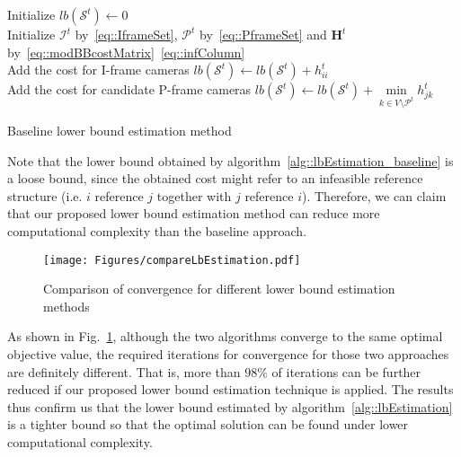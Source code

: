 \begin{algorithm}[]
 \SetAlgoLined
 \BlankLine
 Initialize $lb(\mathcal{S}^t) \gets 0$\\
 Initialize $\mathcal{I}^t$ by~\eqref{eq::IframeSet}, $\mathcal{P}^t$ by~\eqref{eq::PframeSet} and $\mathbf{H}^t$ by~\eqref{eq::modBBcostMatrix}~\eqref{eq::infColumn} \\
 {
 	Add the cost for I-frame cameras $lb(\mathcal{S}^t) \gets lb(\mathcal{S}^t) + h_{ii}^t$ \\
 }
 {
 	Add the cost for candidate P-frame cameras $lb(\mathcal{S}^t) \gets lb(\mathcal{S}^t) + \underset{k \in V \setminus \mathcal{P}^t}{\min} h_{jk}^t$ \\
 }
 \caption{\label{alg::lbEstimation_baseline}Baseline lower bound estimation method}
\end{algorithm}
\DecMargin{1em}
%

Note that the lower bound obtained by algorithm~\ref{alg::lbEstimation_baseline} is a loose bound, since the obtained cost might refer to an infeasible reference structure (i.e. $i$ reference $j$ together with $j$ reference $i$).
Therefore, we can claim that our proposed lower bound estimation method can reduce more computational complexity than the baseline approach.
%
\begin{figure}
\begin{center}
\texttt{[image: Figures/compareLbEstimation.pdf]}
\caption{\label{fig::compareLbEstimation} Comparison of convergence for different lower bound estimation methods}
\end{center}
\end{figure}
%
As shown in Fig.~\ref{fig::compareLbEstimation}, although the two algorithms converge to the same optimal objective value, the required iterations for convergence for those two approaches are definitely different.
That is, more than $98\%$ of iterations can be further reduced if our proposed lower bound estimation technique is applied.
The results thus confirm us that the lower bound estimated by algorithm~\ref{alg::lbEstimation} is a tighter bound so that the optimal solution can be found under lower computational complexity.


